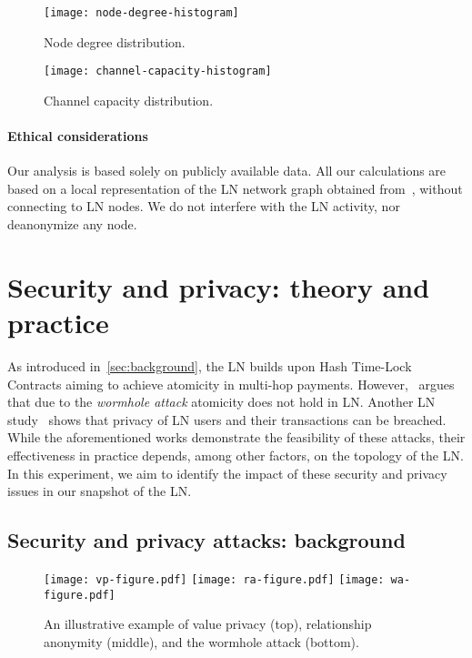 \begin{figure}[tb]
	\centering
	\texttt{[image: node-degree-histogram]}
	\caption{Node degree distribution.\label{fig:node-degree-histogram}}
\end{figure}

\begin{figure}[tb]
	\centering
	\texttt{[image: channel-capacity-histogram]}
	\caption{Channel capacity distribution.\label{fig:channel-capacity-histogram}}
\end{figure}

\paragraph{Ethical considerations} 
Our analysis is based solely on publicly available data.
All our calculations are based on a local representation of the LN network graph obtained from~\cite{fiatjaf2020}, without connecting to LN nodes.
We do not interfere with the LN activity, nor deanonymize any node.



\section{Security and privacy: theory and practice}
\label{sec:sec-priv-attacks}

As introduced in~\cref{sec:background}, the LN builds upon Hash Time-Lock Contracts aiming to achieve atomicity in multi-hop payments.
However,~\cite{Malavolta2019} argues that due to the \emph{wormhole attack} atomicity does not hold in LN\@.
Another LN study~\cite{Malavolta2017} shows that privacy of LN users and their transactions can be breached.
While the aforementioned works demonstrate the feasibility of these attacks, their effectiveness in practice depends, among other factors, on the topology of the LN\@.
In this experiment, we aim to identify the impact of these security and privacy issues in our snapshot of the LN\@.

\subsection{Security and privacy attacks: background}

\begin{figure*}[tb]
	\texttt{[image: vp-figure.pdf]}
	\vspace{0.3cm}
	\texttt{[image: ra-figure.pdf]}
	\vspace{0.3cm}
	\texttt{[image: wa-figure.pdf]}
	\caption{An illustrative example of value privacy (top), relationship anonymity (middle), and the wormhole attack (bottom).}
	\label{fig:wormhole-attack}
\end{figure*}


